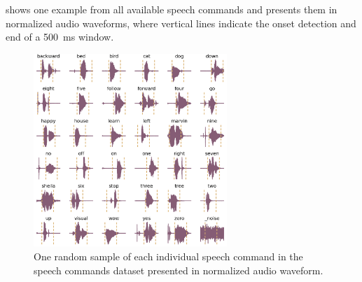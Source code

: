  shows one example from all available speech commands and presents them in normalized audio waveforms, where vertical lines indicate the onset detection and end of a \SI{500}{\milli\second} window.
\begin{figure}[!ht]
  \centering
    \includegraphics[width=0.65\textwidth]{./5_exp/figs/exp_dataset_speech_cmd_wav_grid.png}
  \caption{One random sample of each individual speech command in the speech commands dataset presented in normalized audio waveform.}
  \label{fig:exp_dataset_speech_cmd_wav_grid}
\end{figure}
\FloatBarrier
\noindent



